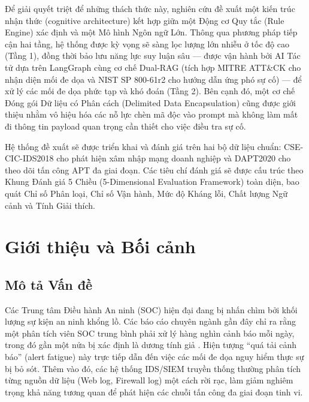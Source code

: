 \documentclass[12pt,a4paper]{article}
\begin{document}
Để giải quyết triệt để những thách thức này, nghiên cứu đề xuất một kiến trúc nhận thức (cognitive architecture) kết hợp giữa một Động cơ Quy tắc (Rule Engine) xác định và một Mô hình Ngôn ngữ Lớn. Thông qua phương pháp tiếp cận hai tầng, hệ thống được kỳ vọng sẽ sàng lọc lượng lớn nhiễu ở tốc độ cao (Tầng 1), đồng thời bảo lưu năng lực suy luận sâu --- được vận hành bởi AI Tác tử dựa trên LangGraph cùng cơ chế Dual-RAG (tích hợp MITRE ATT\&CK cho nhận diện mối đe dọa và NIST SP 800-61r2 cho hướng dẫn ứng phó sự cố) --- để xử lý các mối đe dọa phức tạp và khó đoán (Tầng 2). Bên cạnh đó, một cơ chế Đóng gói Dữ liệu có Phân cách (Delimited Data Encapsulation) cũng được giới thiệu nhằm vô hiệu hóa các nỗ lực chèn mã độc vào prompt mà không làm mất đi thông tin payload quan trọng cần thiết cho việc điều tra sự cố.

Hệ thống đề xuất sẽ được triển khai và đánh giá trên hai bộ dữ liệu chuẩn: CSE-CIC-IDS2018 cho phát hiện xâm nhập mạng doanh nghiệp và DAPT2020 cho theo dõi tấn công APT đa giai đoạn. Các tiêu chí đánh giá sẽ được cấu trúc theo Khung Đánh giá 5 Chiều (5-Dimensional Evaluation Framework) toàn diện, bao quát Chỉ số Phân loại, Chỉ số Vận hành, Mức độ Kháng lỗi, Chất lượng Ngữ cảnh và Tính Giải thích.

\newpage
\tableofcontents

\newpage
\section{Giới thiệu và Bối cảnh}

\subsection{Mô tả Vấn đề}
Các Trung tâm Điều hành An ninh (SOC) hiện đại đang bị nhấn chìm bởi khối lượng sự kiện an ninh khổng lồ. Các báo cáo chuyên ngành gần đây chỉ ra rằng một phân tích viên SOC trung bình phải xử lý hàng nghìn cảnh báo mỗi ngày, trong đó gần một nửa bị xác định là dương tính giả \cite{ponemon2023}. Hiện tượng ``quá tải cảnh báo'' (alert fatigue) này trực tiếp dẫn đến việc các mối đe dọa nguy hiểm thực sự bị bỏ sót. Thêm vào đó, các hệ thống IDS/SIEM truyền thống thường phân tích từng nguồn dữ liệu (Web log, Firewall log) một cách rời rạc, làm giảm nghiêm trọng khả năng tương quan để phát hiện các chuỗi tấn công đa giai đoạn tinh vi.
\end{document}
